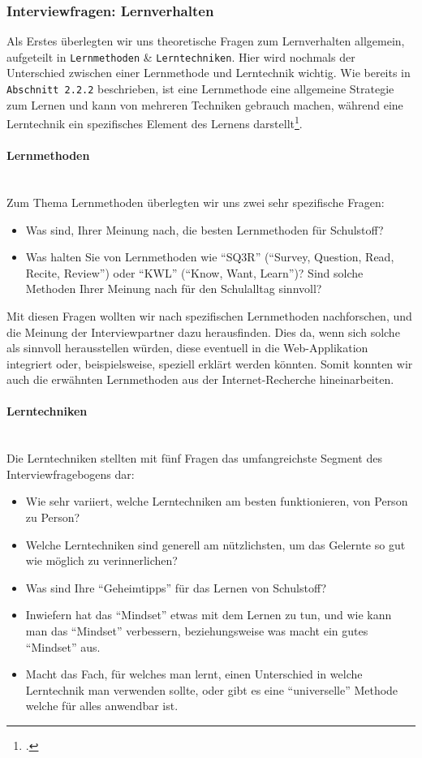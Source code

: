 \documentclass[12pt,a4paper]{report}
\newcommand{\myparagraph}[1]{\paragraph{#1}\mbox{}\\}
\begin{document}
\subsubsection {Interviewfragen: Lernverhalten}
Als Erstes überlegten wir uns theoretische Fragen zum Lernverhalten allgemein, aufgeteilt in \texttt{Lernmethoden} \& \texttt{Lerntechniken}. 
Hier wird nochmals der Unterschied zwischen einer Lernmethode und Lerntechnik wichtig. 
Wie bereits in \texttt{Abschnitt 2.2.2} beschrieben, ist eine Lernmethode eine allgemeine Strategie zum Lernen und kann von mehreren Techniken gebrauch machen, während eine Lerntechnik ein spezifisches Element des Lernens darstellt\footcite{Lerntechnik_1}.


\myparagraph{Lernmethoden}
Zum Thema Lernmethoden überlegten wir uns zwei sehr spezifische Fragen:
\begin{itemize}
    \item Was sind, Ihrer Meinung nach, die besten Lernmethoden für Schulstoff?
    \item Was halten Sie von Lernmethoden wie \enquote{SQ3R} (\enquote{Survey, Question, Read, Recite, Review}) oder \enquote{KWL} (\enquote{Know, Want, Learn})? Sind solche Methoden Ihrer Meinung nach für den Schulalltag sinnvoll?
 \end{itemize}

 Mit diesen Fragen wollten wir nach spezifischen Lernmethoden nachforschen, und die Meinung der Interviewpartner dazu herausfinden. 
 Dies da, wenn sich solche als sinnvoll herausstellen würden, diese eventuell in die Web-Applikation integriert oder, beispielsweise, speziell erklärt werden könnten.
 Somit konnten wir auch die erwähnten Lernmethoden aus der Internet-Recherche hineinarbeiten.

\myparagraph{Lerntechniken}
Die Lerntechniken stellten mit fünf Fragen das umfangreichste Segment des Interviewfragebogens dar:
\begin{itemize}
    \item Wie sehr variiert, welche Lerntechniken am besten funktionieren, von Person zu Person?
    \item Welche Lerntechniken sind generell am nützlichsten, um das Gelernte so gut wie möglich zu verinnerlichen?
    \item Was sind Ihre \enquote{Geheimtipps} für das Lernen von Schulstoff?
    \item Inwiefern hat das \enquote{Mindset} etwas mit dem Lernen zu tun, und wie kann man das \enquote{Mindset} verbessern, beziehungsweise was macht ein gutes \enquote{Mindset} aus.
    \item Macht das Fach, für welches man lernt, einen Unterschied in welche Lerntechnik man verwenden sollte, oder gibt es eine \enquote{universelle} Methode welche für alles anwendbar ist. 
\end{itemize}
\end{document}
